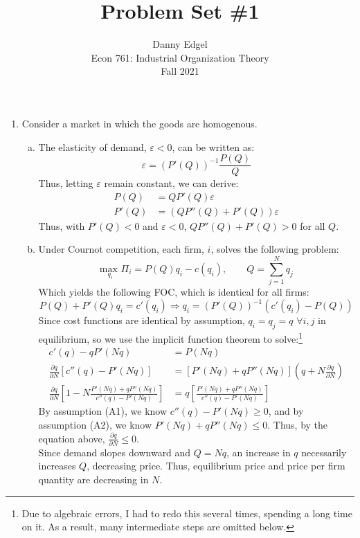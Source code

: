 \documentclass{article}
\newcommand{\usmax}[1]{\underset{#1}{\text{max }}}
\newcommand{\pl}{\partial}
\begin{document}
\title{	Problem Set \#1 }
\author{ 		Danny Edgel 						\\ 
			Econ 761: Industrial Organization Theory	\\
			Fall 2021						\\
		}
\maketitle\thispagestyle{empty}



\begin{enumerate}
	\item Consider a market in which the goods are homogenous.
		\begin{enumerate}[(a)]
			\item The elasticity of demand, $\varepsilon<0$, can be written as: 
                \[ \varepsilon = \left(P'(Q)\right)^{-1}\frac{P(Q)}{Q} \]
				Thus, letting $\varepsilon$ remain constant, we can derive:
				\begin{align*}
					P(Q)	&= QP'(Q)\varepsilon				\\
					P'(Q)	&= \left(QP''(Q) + P'(Q)\right)\varepsilon
				\end{align*}
				Thus, with $P'(Q)<0$ and $\varepsilon<0$, ${QP''(Q) + P'(Q)>0}$ for all $Q$.

			\item Under Cournot competition, each firm, $i$, solves the following problem:
                \[
                    \usmax{q_i}\Pi_i = P(Q)q_i - c(q_i),\quad\quad Q = \sum_{j=1}^N q_j
                    \]
                Which yields the following FOC, which is identical for all firms:
                \[
                    P(Q) + P'(Q)q_i = c'(q_i)\Rightarrow q_i = \left(P'(Q)\right)^{-1}\left(c'(q_i) - P(Q)\right)
                    \]
                Since cost functions are identical by assumption, $q_i=q_j=q$ $\forall i,j$ in equilibrium, so we use the implicit function theorem to solve:\footnote{Due to algebraic errors, I had to redo this several times, spending a long time on it. As a result, many intermediate steps are omitted below.}
                \begin{align*}
                    c'(q) - qP'(Nq) &= P(Nq)    \\
                    \frac{\pl q}{\pl N}\left[c''(q)-P'(Nq)\right] &= \left[P'(Nq) + qP''(Nq)\right]\left(q + N\frac{\pl q}{\pl N}\right)   \\
                    \frac{\pl q}{\pl N}\left[1-N\frac{P'(Nq) + qP''(Nq)}{c''(q)-P'(Nq)}\right] &= q\left[\frac{P'(Nq) + qP''(Nq)}{c''(q)-P'(Nq)}\right]
                \end{align*}
                By assumption (A1), we know $c''(q)-P'(Nq)\geq 0$, and by assumption (A2), we know ${P'(Nq)+qP''(Nq)\leq 0}$. Thus, by the equation above, $\frac{\pl q}{\pl N}\leq 0$. \medskip \\
                Since demand slopes downward and $Q=Nq$, an increase in $q$ necessarily increases $Q$, decreasing price. Thus, equilibrium price and price per firm quantity are decreasing in $N$.
		\end{enumerate}


\end{enumerate}
\end{document}
